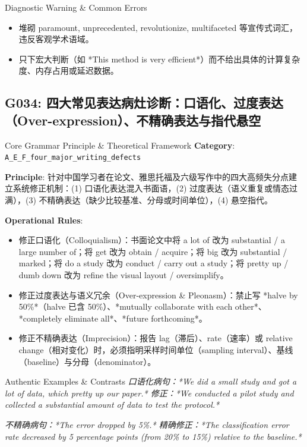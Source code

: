 \begin{TipBox}{Diagnostic Warning \& Common Errors}
\begin{itemize}[leftmargin=1.5em, itemsep=1pt]
  \item 堆砌 paramount, unprecedented, revolutionize, multifaceted 等宣传式词汇，违反客观学术语域。
  \item 只下宏大判断（如 *This method is very efficient*）而不给出具体的计算复杂度、内存占用或延迟数据。
\end{itemize}
\end{TipBox}
\vspace{6pt}
\subsection{G034: 四大常见表达病灶诊断：口语化、过度表达（Over-expression）、不精确表达与指代悬空}\label{sec:rule:G034}
\begin{ConceptBox}{Core Grammar Principle \& Theoretical Framework}
\textbf{Category}: \texttt{A\_E\_F\_four\_major\_writing\_defects}\par\vspace{3pt}
\textbf{Principle}: 针对中国学习者在论文、雅思托福及六级写作中的四大高频失分点建立系统修正机制：(1) 口语化表达混入书面语，(2) 过度表达（语义重复或情态过满），(3) 不精确表达（缺少比较基准、分母或时间单位），(4) 悬空指代。\par\vspace{4pt}
\textbf{Operational Rules}:
\begin{itemize}[leftmargin=1.5em, itemsep=1pt]
  \item 修正口语化（Colloquialism）：书面论文中将 a lot of 改为 substantial / a large number of；将 get 改为 obtain / acquire；将 big 改为 substantial / marked；将 do a study 改为 conduct / carry out a study；将 pretty up / dumb down 改为 refine the visual layout / oversimplify。
  \item 修正过度表达与语义冗余（Over-expression \& Pleonasm）：禁止写 *halve by 50\%*（halve 已含 50\%）、*mutually collaborate with each other*、*completely eliminate all*、*future forthcoming*。
  \item 修正不精确表达（Imprecision）：报告 lag（滞后）、rate（速率）或 relative change（相对变化）时，必须指明采样时间单位（sampling interval）、基线（baseline）与分母（denominator）。
\end{itemize}
\end{ConceptBox}
\begin{ExampleBox}{Authentic Examples \& Contrasts}
\textit{口语化病句：*We did a small study and got a lot of data, which pretty up our paper.*
修正：*We conducted a pilot study and collected a substantial amount of data to test the protocol.*}\par\vspace{2pt}
\textit{不精确病句：*The error dropped by 5\%.*
精确修正：*The classification error rate decreased by 5 percentage points (from 20\% to 15\%) relative to the baseline.*}\par\vspace{2pt}
\end{ExampleBox}
